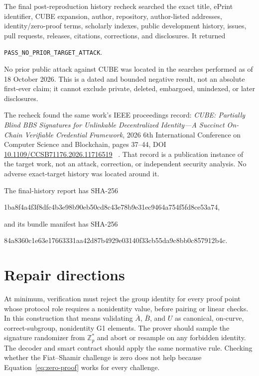 \documentclass[10pt,a4paper]{article}
\newcommand{\Zp}{\mathbb{Z}_p}
\begin{document}
The final post-reproduction history recheck searched the exact title, ePrint
identifier, CUBE expansion, author, repository, author-listed addresses,
identity/zero-proof terms, scholarly indexes, public development history,
issues, pull requests, releases, citations, corrections, and disclosures. It
returned
\begin{center}
\texttt{PASS\_NO\_PRIOR\_TARGET\_ATTACK}.
\end{center}
No prior public attack against CUBE was located in the searches performed as
of 18 October 2026. This is a dated and bounded negative result, not an
absolute first-ever claim; it cannot exclude private, deleted, embargoed,
unindexed, or later disclosures.

The recheck found the same work's IEEE proceedings record: \emph{CUBE:
Partially Blind BBS Signatures for Unlinkable Decentralized Identity---A
Succinct On-Chain Verifiable Credential Framework}, 2026 6th International
Conference on Computer Science and Blockchain, pages 37--44, DOI
\href{https://doi.org/10.1109/CCSB71176.2026.11716519}{10.1109/CCSB71176.2026.11716519}
~\cite{cubeieee}. That record is a publication instance of the target work,
not an attack, correction, or independent security analysis. No adverse
exact-target history was located around it.

The final-history report has SHA-256
\begin{center}
\small\ttfamily
1ba8f4a4f3f8dfc4b3e98b90eb50cd8c43e78b9e31ec9464a754f5fd8ce53a74,
\end{center}
and its bundle manifest has SHA-256
\begin{center}
\small\ttfamily
84a8360c1e63e17663331aa42d87b4929e03140f33cb55da9c8bb0c857912b4c.
\end{center}

\section{Repair directions}

At minimum, verification must reject the group identity for every proof point
whose protocol role requires a nonidentity value, before pairing or linear
checks. In this construction that means validating $\bar A$, $\bar B$, and
$U$ as canonical, on-curve, correct-subgroup, nonidentity G1 elements. The
prover should sample the signature randomizer from $\Zp^*$ and abort or
resample on any forbidden identity. The decoder and smart contract should
apply the same normative rule. Checking whether the Fiat--Shamir challenge is
zero does not help because Equation~\eqref{eq:zero-proof} works for every
challenge.
\end{document}
